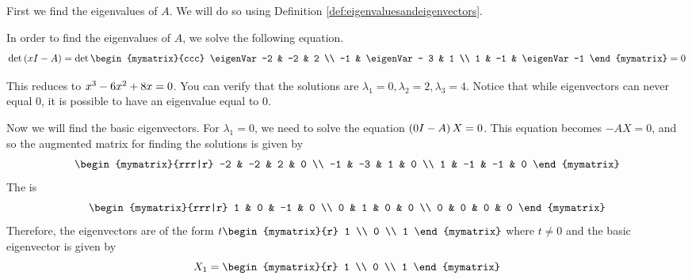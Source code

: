 \begin{solution}
First we find the eigenvalues of $A$. We will do so using Definition
\ref{def:eigenvaluesandeigenvectors}. 

In order to find the eigenvalues of $A$, we solve the following equation.
\begin{equation*}
\det \tup{\eigenVar I -A } =
\det  \begin{mymatrix}{ccc}
\eigenVar -2 & -2 & 2 \\
 -1 & \eigenVar - 3  & 1 \\
1 & -1 &  \eigenVar  -1 
\end{mymatrix}
 =0
\end{equation*}

This reduces to $ x^{3}-6 x^{2}+8x =0$. You can verify that the
solutions are $ \lambda_1 = 0, \lambda_2 = 2, \lambda_3 = 4$.
Notice that while eigenvectors can never equal $0$, it is possible to have an eigenvalue equal to $0$. 

Now we will find the basic eigenvectors. For $\lambda_1 =0$, we need to solve the equation
$\left(0 I - A \right) X = 0$. This equation becomes $-AX=0$, and so the augmented matrix for finding
the solutions is given by 
\begin{equation*}
\begin{mymatrix}{rrr|r}
-2 & -2 & 2 & 0 \\
-1 & -3 & 1 & 0 \\
1 & -1 & -1 & 0
\end{mymatrix}
\end{equation*}
The {\rref} is
\begin{equation*}
\begin{mymatrix}{rrr|r}
1 & 0 & -1 & 0 \\
0 & 1 &  0 & 0 \\
0 & 0 &  0 & 0
\end{mymatrix}
\end{equation*}
Therefore, the eigenvectors are of the form $ t\begin{mymatrix}{r}
1 \\
0 \\
1
\end{mymatrix}$ where $t\neq 0$ and the basic eigenvector is given by
\begin{equation*}
X_1
=
\begin{mymatrix}{r}
1 \\
0 \\
1
\end{mymatrix}
\end{equation*}


\end{solution}
